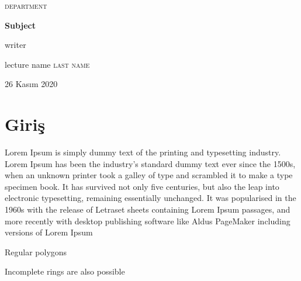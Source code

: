 \documentclass{article}
\begin{document}
\begin{titlepage}
  \centering
 

  \vspace{0.5cm}
  {\scshape\Large department \par}
  \vspace{1.5cm}
  {\huge\bfseries Subject \par}
  \vspace{2cm}
  {\Large {\selectfont writer } \par}
  \vfill

lecture name \textsc{last name}

  \vfill

  {\large 26 Kasım 2020\par}
\end{titlepage}
\newpage


\tableofcontents
\listoffigures
\listoftables
\newpage
\section{Giriş}

Lorem Ipsum is simply dummy text of the printing and typesetting industry. Lorem Ipsum has been the industry's standard dummy text ever since the 1500s, when an unknown printer took a galley of type and scrambled it to make a type specimen book. It has survived not only five centuries, but also the leap into electronic typesetting, remaining essentially unchanged. It was popularised in the 1960s with the release of Letraset sheets containing Lorem Ipsum passages, and more recently with desktop publishing software like Aldus PageMaker including versions of Lorem Ipsum 


Regular polygons


Incomplete rings are also possible

\end{document}
